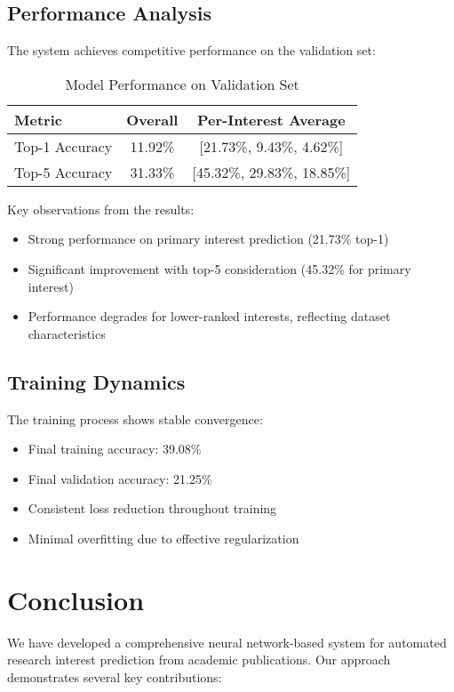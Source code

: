 \documentclass[preprint,12pt]{elsarticle}
\begin{document}
\subsection{Performance Analysis}
The system achieves competitive performance on the validation set:

\begin{table}[h]
\centering
\begin{tabular}{l c c}
\hline
Metric & Overall & Per-Interest Average \\
\hline
Top-1 Accuracy & 11.92\% & [21.73\%, 9.43\%, 4.62\%] \\
Top-5 Accuracy & 31.33\% & [45.32\%, 29.83\%, 18.85\%] \\
\hline
\end{tabular}
\caption{Model Performance on Validation Set}
\label{tab1}
\end{table}

Key observations from the results:
\begin{itemize}
    \item Strong performance on primary interest prediction (21.73\% top-1)
    \item Significant improvement with top-5 consideration (45.32\% for primary interest)
    \item Performance degrades for lower-ranked interests, reflecting dataset characteristics
\end{itemize}

\subsection{Training Dynamics}
The training process shows stable convergence:
\begin{itemize}
    \item Final training accuracy: 39.08\%
    \item Final validation accuracy: 21.25\%
    \item Consistent loss reduction throughout training
    \item Minimal overfitting due to effective regularization
\end{itemize}

\section{Conclusion}
\label{sec5}

We have developed a comprehensive neural network-based system for automated research interest prediction from academic publications. Our approach demonstrates several key contributions:
\end{document}
